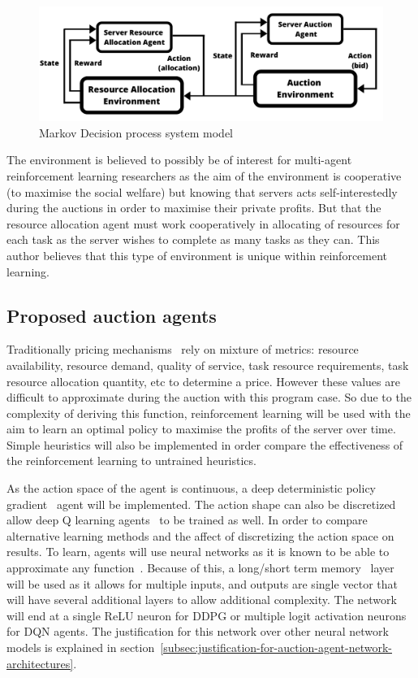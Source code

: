 \begin{figure}
    \centering
    \includegraphics[width=14cm]{figures/flexible_resource_allocation_env.pdf}
    \caption{Markov Decision process system model}
    \label{fig:mdp_system_model}
\end{figure}

The environment is believed to possibly be of interest for multi-agent reinforcement learning researchers as the aim
of the environment is cooperative (to maximise the social welfare) but knowing that servers acts self-interestedly
during the auctions in order to maximise their private profits. But that the resource allocation agent must work
cooperatively in allocating of resources for each task as the server wishes to complete as many tasks as they can.
This author believes that this type of environment is unique within reinforcement learning.

\subsection{Proposed auction agents}\label{subsec:proposed-auction-agents}
Traditionally pricing mechanisms~\citep{al2013cloud} rely on mixture of metrics: resource availability, resource demand,
quality of service, task resource requirements, task resource allocation quantity, etc to determine a price. However
these values are difficult to approximate during the auction with this program case. So due to the complexity of
deriving this function, reinforcement learning will be used with the aim to learn an optimal policy to maximise the
profits of the server over time. Simple heuristics will also be implemented in order compare the effectiveness of the
reinforcement learning to untrained heuristics.

As the action space of the agent is continuous, a deep deterministic policy gradient~\citep{ddpg} agent
will be implemented. The action shape can also be discretized allow deep Q learning agents~\cite{atari} to be trained
as well. In order to compare alternative learning methods and the affect of discretizing the action space on results.
To learn, agents will use neural networks as it is known to be able to approximate any
function~\citep{csaji2001approximation}. Because of this, a long/short term memory~\citep{LSTM} layer will be used as
it allows for multiple inputs, and outputs are single vector that will have several additional layers to allow
additional complexity. The network will end at a single ReLU neuron for DDPG or multiple logit activation neurons for
DQN agents. The justification for this network over other neural network models is explained in
section~\ref{subsec:justification-for-auction-agent-network-architectures}.

